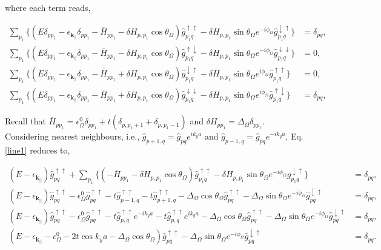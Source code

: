 \documentclass[10pt,prb,showpacs,amssymb,floatfix]{revtex4-1}
\newcommand{\dna}{\downarrow}
\newcommand{\nn}{\nonumber}
\newcommand{\upa}{\uparrow}
\newcommand{\dlt}{\delta}
\newcommand{\Dlt}{\Delta}
\newcommand{\eps}{\epsilon}
\newcommand{\Og}{\Omega}
\newcommand{\h}{\hat}
\begin{document}
where each term reads,

\begin{align}
\label{line1}
\sum_{p_1} \Bigg \{ (E\dlt_{pp_1}-\eps_{\bm{k}_{||}}\dlt_{pp_1} -\overline{H}_{pp_1}  -\dlt H_{p,p_1} \cos\theta_\Og) \hat{g}^{\upa\upa}_{p_1q} -\dlt H_{p,p_1} \sin\theta_\Og e^{-i\phi_\Og}  \hat{g}^{\dna\upa}_{p_1q} \Bigg \}&=\dlt_{pq}, \\
\label{line2}
\sum_{p_1} \Bigg \{ (E\dlt_{pp_1}-\eps_{\bm{k}_{||}}\dlt_{pp_1} -\overline{H}_{pp_1}  -\dlt H_{p,p_1} \cos\theta_\Og) \hat{g}^{\upa\dna}_{p_1q} -\dlt H_{p,p_1} \sin\theta_\Og e^{-i\phi_\Og}  \hat{g}^{\dna\dna}_{p_1q} \Bigg \}&=0, \\
\label{line3}
\sum_{p_1} \Bigg \{ (E\dlt_{pp_1}-\eps_{\bm{k}_{||}}\dlt_{pp_1} -\overline{H}_{pp_1}  +\dlt H_{p,p_1} \cos\theta_\Og) \hat{g}^{\dna\upa}_{p_1q} -\dlt H_{p,p_1} \sin\theta_\Og e^{i\phi_\Og}  \hat{g}^{\upa\upa}_{p_1q} \Bigg \}&=0, \\
\sum_{p_1} \Bigg \{ (E\dlt_{pp_1}-\eps_{\bm{k}_{||}}\dlt_{pp_1} -\overline{H}_{pp_1}  +\dlt H_{p,p_1} \cos\theta_\Og) \hat{g}^{\dna\dna}_{p_1q} -\dlt H_{p,p_1} \sin\theta_\Og e^{i\phi_\Og}  \hat{g}^{\upa\dna}_{p_1q} \Bigg \}&=\dlt_{pq}, 
 \label{line4}
\end{align}

Recall that $\overline H_{pp_1} = \eps^0_\Og \dlt_{pp_1} + t(\dlt_{p,p_1+1} + \dlt_{p,p_1-1})$ and $\dlt H_{pp_1} = \Dlt_\Og \dlt_{pp_1}$.
Considering nearest neighbours, i.e., $\h g_{p+1,q} = \h g_{pq}e^{ik_ya}$ and $\h g_{p-1,q} = \h g_{pq}e^{-ik_ya}$, Eq. \eqref{line1} reduces to, 

\begin{align}
(E-\eps_{\bm{k}_{||}})\hat{g}^{\upa\upa}_{pq} + \sum_{p_1} \Bigg \{ ( -\overline{H}_{pp_1}  -\dlt H_{p,p_1} \cos\theta_\Og) \hat{g}^{\upa\upa}_{p_1q} -\dlt H_{p,p_1} \sin\theta_\Og e^{-i\phi_\Og}  \hat{g}^{\dna\upa}_{p_1q} \Bigg \}&=\dlt_{pq}, \nn\\
(E-\eps_{\bm{k}_{||}})\hat{g}^{\upa\upa}_{pq} - \eps_\Og^0 \hat{g}^{\upa\upa}_{pq}  -t \hat{g}^{\upa\upa}_{p-1,q} -t \hat{g}^{\upa\upa}_{p+1,q}  -\Dlt_\Og \cos\theta_\Og \hat{g}^{\upa\upa}_{pq} -\Dlt_\Og \sin\theta_\Og e^{-i\phi_\Og}  \hat{g}^{\dna\upa}_{pq} &=\dlt_{pq}, \nn\\
(E-\eps_{\bm{k}_{||}})\hat{g}^{\upa\upa}_{pq} - \eps_\Og^0 \hat{g}^{\upa\upa}_{pq}  -t \hat{g}^{\upa\upa}_{p,q}e^{-ik_ya} -t \hat{g}^{\upa\upa}_{p,q}e^{ik_ya}  -\Dlt_\Og \cos\theta_\Og \hat{g}^{\upa\upa}_{pq} -\Dlt_\Og \sin\theta_\Og e^{-i\phi_\Og}  \hat{g}^{\dna\upa}_{pq} &=\dlt_{pq}, \nn\\
(E-\eps_{\bm{k}_{||}}- \eps_\Og^0   -2t\cos k_ya  -\Dlt_\Og \cos\theta_\Og) \hat{g}^{\upa\upa}_{pq} -\Dlt_\Og \sin\theta_\Og e^{-i\phi_\Og}  \hat{g}^{\dna\upa}_{pq} &=\dlt_{pq}.
 \label{tbschrodinger41}
\end{align}
\end{document}
